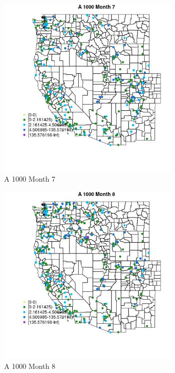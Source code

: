 \begin{figure} 
\centering  
\includegraphics[width=0.77\textwidth]{Code_Outputs/Report_ML_input_PM25_Step4_part_e_de_duplicated_aveswNAs_MapObsMo7A_1000.jpg} 
\caption{\label{fig:Report_ML_input_PM25_Step4_part_e_de_duplicated_aveswNAsMapObsMo7A_1000}A 1000 Month 7} 
\end{figure} 
 

\begin{figure} 
\centering  
\includegraphics[width=0.77\textwidth]{Code_Outputs/Report_ML_input_PM25_Step4_part_e_de_duplicated_aveswNAs_MapObsMo8A_1000.jpg} 
\caption{\label{fig:Report_ML_input_PM25_Step4_part_e_de_duplicated_aveswNAsMapObsMo8A_1000}A 1000 Month 8} 
\end{figure} 
 

